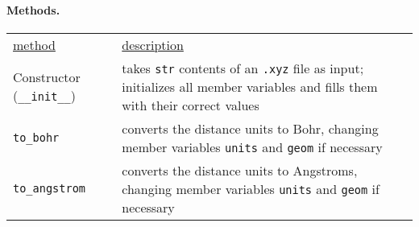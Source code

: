 \documentclass[fleqn]{article}
\newcommand{\linl}[1]{\lstinline{#1}{}}
\newcommand{\ul}[1]{\underline{#1}}
\begin{document}
\paragraph{Methods.}
\begin{center}
\begin{tabular}{p{}@{}p{}}
  \ul{method} & \ul{description}\\
  Constructor (\linl{__init__})
  & takes \linl{str} contents of an \linl{.xyz} file as input; initializes all member variables and fills them with their correct values\\
  \linl{to_bohr}
  & converts the distance units to Bohr, changing member variables \linl{units} and \linl{geom} if necessary \\
  \linl{to_angstrom}
  & converts the distance units to Angstroms, changing member variables \linl{units} and \linl{geom} if necessary
\end{tabular}
\end{center}
\end{document}
